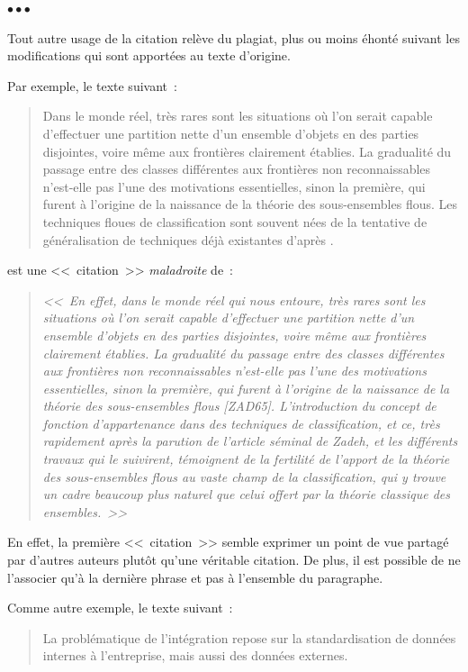 \documentclass[11pt, french, screen, research-development]{report-rd-info}
\newenvironment{explanation}
{\color{blue}
 \begin{list}{}{\hspace{0.2\textwidth}\color{blue}}\item $\bullet\bullet\bullet$
}
{\end{list}}
\begin{document}
\begin{explanation}
   Tout autre usage de la citation relève du plagiat, plus ou moins éhonté suivant les modifications qui sont apportées au texte d'origine.

   Par exemple, le texte suivant~:
   \begin{quote}
      Dans le monde réel, très rares sont les situations où l'on serait capable d'effectuer une partition nette d'un ensemble d'objets en des parties disjointes, voire même aux frontières clairement établies.
      La gradualité du passage entre des classes différentes aux frontières non reconnaissables n'est-elle pas l'une des motivations essentielles, sinon la première, qui furent à l'origine de la naissance de la théorie des sous-ensembles flous.
      Les techniques floues de classification sont souvent nées de la tentative de généralisation de techniques déjà existantes d'après \cite{Khodja-97}.
   \end{quote}
   est une <<~citation~>> \emph{maladroite} de~:
   \begin{quote}
      \emph{<<~En effet, dans le monde réel qui nous entoure, très rares sont les situations où l'on serait capable d'effectuer une partition nette d'un ensemble d'objets en des parties disjointes, voire même aux frontières clairement établies.
      La gradualité du passage entre des classes différentes aux frontières non reconnaissables n'est-elle pas l'une des motivations essentielles, sinon la première, qui furent à l'origine de la naissance de la théorie des sous-ensembles flous [ZAD65].
      L'introduction du concept de fonction d'appartenance dans des techniques de classification, et ce, très rapidement après la parution de l'article séminal de Zadeh, et les différents travaux qui le suivirent, témoignent de la fertilité de l'apport de la théorie des sous-ensembles flous au vaste champ de la classification, qui y trouve un cadre beaucoup plus naturel que celui offert par la théorie classique des ensembles.~>>} \cite{Khodja-97}
   \end{quote}

   En effet, la première <<~citation~>> semble exprimer un point de vue partagé par d'autres auteurs plutôt qu'une véritable citation.
   De plus, il est possible de ne l'associer qu'à la dernière phrase et pas à l'ensemble du paragraphe.

   \bigskip

   Comme autre exemple, le texte suivant~:
   \begin{quote}
      La problématique de l'intégration repose sur la standardisation de données internes à l'entreprise, mais aussi des données externes.


\end{quote}
\end{explanation}
\end{document}
